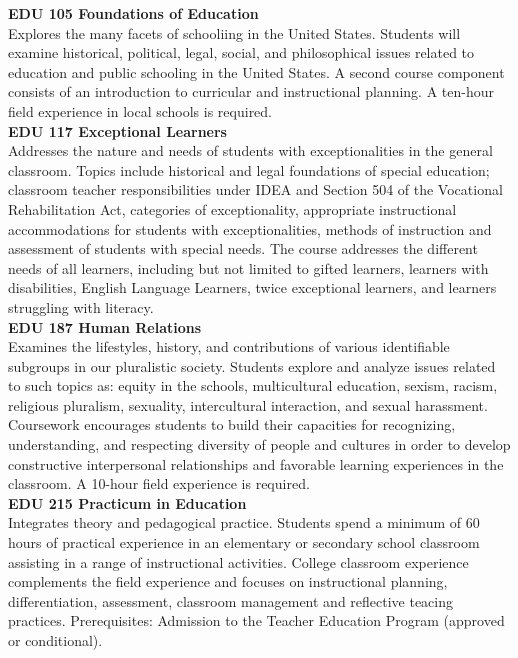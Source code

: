 \documentclass[
  letterpaper,
]{scrbook}
\begin{document}
\textbf{EDU 105 Foundations of Education}\\
Explores the many facets of schooliing in the United States. Students
will examine historical, political, legal, social, and philosophical
issues related to education and public schooling in the United States. A
second course component consists of an introduction to curricular and
instructional planning. A ten-hour field experience in local schools is
required.\\
\textbf{EDU 117 Exceptional Learners}\\
Addresses the nature and needs of students with exceptionalities in the
general classroom. Topics include historical and legal foundations of
special education; classroom teacher responsibilities under IDEA and
Section 504 of the Vocational Rehabilitation Act, categories of
exceptionality, appropriate instructional accommodations for students
with exceptionalities, methods of instruction and assessment of students
with special needs. The course addresses the different needs of all
learners, including but not limited to gifted learners, learners with
disabilities, English Language Learners, twice exceptional learners, and
learners struggling with literacy.\\
\textbf{EDU 187 Human Relations}\\
Examines the lifestyles, history, and contributions of various
identifiable subgroups in our pluralistic society. Students explore and
analyze issues related to such topics as: equity in the schools,
multicultural education, sexism, racism, religious pluralism, sexuality,
intercultural interaction, and sexual harassment. Coursework encourages
students to build their capacities for recognizing, understanding, and
respecting diversity of people and cultures in order to develop
constructive interpersonal relationships and favorable learning
experiences in the classroom. A 10-hour field experience is required.\\
\textbf{EDU 215 Practicum in Education}\\
Integrates theory and pedagogical practice. Students spend a minimum of
60 hours of practical experience in an elementary or secondary school
classroom assisting in a range of instructional activities. College
classroom experience complements the field experience and focuses on
instructional planning, differentiation, assessment, classroom
management and reflective teacing practices. Prerequisites: Admission to
the Teacher Education Program (approved or conditional).\\
\end{document}
